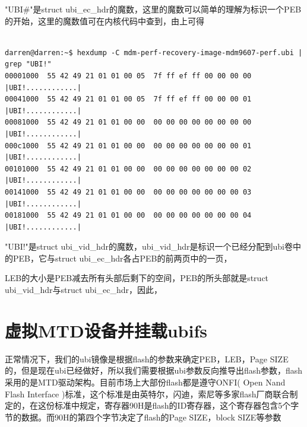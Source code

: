 "UBI\#"是struct ubi\_ec\_hdr的魔数，这里的魔数可以简单的理解为标识一个PEB的开始，这里的魔数值可在内核代码中查到，由上可得
\begin{mdframed}[backgroundcolor=ubuntured,fontcolor=white,hidealllines=true]
\begin{verbatim}

darren@darren:~$ hexdump -C mdm-perf-recovery-image-mdm9607-perf.ubi | grep "UBI!"
00001000  55 42 49 21 01 01 00 05  7f ff ef ff 00 00 00 00  |UBI!............|
00041000  55 42 49 21 01 01 00 05  7f ff ef ff 00 00 00 01  |UBI!............|
00081000  55 42 49 21 01 01 00 00  00 00 00 00 00 00 00 00  |UBI!............|
000c1000  55 42 49 21 01 01 00 00  00 00 00 00 00 00 00 01  |UBI!............|
00101000  55 42 49 21 01 01 00 00  00 00 00 00 00 00 00 02  |UBI!............|
00141000  55 42 49 21 01 01 00 00  00 00 00 00 00 00 00 03  |UBI!............|
00181000  55 42 49 21 01 01 00 00  00 00 00 00 00 00 00 04  |UBI!............|

\end{verbatim}
\end{mdframed}

"UBI!"是struct ubi\_vid\_hdr的魔数，ubi\_vid\_hdr是标识一个已经分配到ubi卷中的PEB，它与struct ubi\_ec\_hdr各占PEB的前两页中的一页，

LEB的大小是PEB减去所有头部后剩下的空间，PEB的所头部就是struct ubi\_vid\_hdr与struct ubi\_ec\_hdr，因此，

\section{虚拟MTD设备并挂载ubifs}
正常情况下，我们的ubi镜像是根据flash的参数来确定PEB，LEB，Page SIZE的，但是现在ubi已经做好，所以我们需要根据ubi参数反向推导出flash参数，flash采用的是MTD驱动架构。目前市场上大部份flash都是遵守ONFI( Open Nand Flash Interface )标准，这个标准是由英特尔，闪迪，索尼等多家flash厂商联合制定的，在这份标准中规定，寄存器90H是flash的ID寄存器，这个寄存器包含5个字节的数据。而90H的第四个字节决定了flash的Page SIZE，block SIZE等参数

